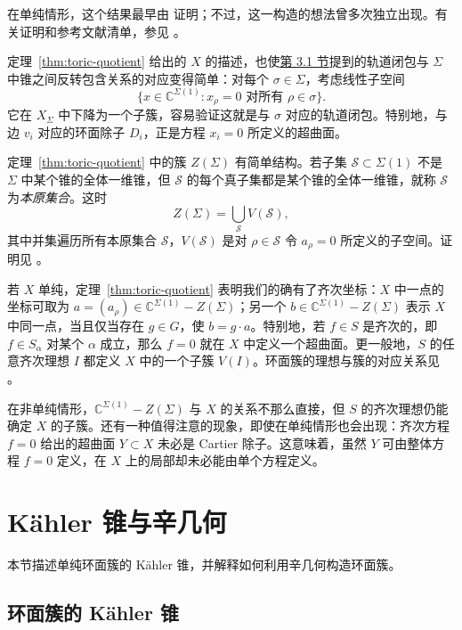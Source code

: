 在单纯情形，这个结果最早由  证明；不过，这一构造的想法曾多次独立出现。有关证明和参考文献清单，参见 。

定理~\ref{thm:toric-quotient} 给出的 $X$ 的描述，也使\hyperref[sec:cones-fans]{第 3.1 节}提到的轨道闭包与 $\Sigma$ 中锥之间反转包含关系的对应变得简单：对每个 $\sigma\in\Sigma$，考虑线性子空间
\[
\{x\in\mathbb C^{\Sigma(1)}:x_\rho=0
\text{ 对所有 }\rho\in\sigma\}.
\]
它在 $X_\Sigma$ 中下降为一个子簇，容易验证这就是与 $\sigma$ 对应的轨道闭包。特别地，与边 $v_i$ 对应的环面除子 $D_i$，正是方程 $x_i=0$ 所定义的超曲面。

定理~\ref{thm:toric-quotient} 中的簇 $Z(\Sigma)$ 有简单结构。若子集 $\mathcal S\subset\Sigma(1)$ 不是 $\Sigma$ 中某个锥的全体一维锥，但 $\mathcal S$ 的每个真子集都是某个锥的全体一维锥，就称 $\mathcal S$ 为\emph{本原集合}。这时
\begin{equation}\label{eq:toric-primitive-z}
Z(\Sigma)=\bigcup_{\mathcal S}V(\mathcal S),
\end{equation}
其中并集遍历所有本原集合 $\mathcal S$，$V(\mathcal S)$ 是对 $\rho\in\mathcal S$ 令 $a_\rho=0$ 所定义的子空间。证明见 。

若 $X$ 单纯，定理~\ref{thm:toric-quotient} 表明我们的确有了齐次坐标：$X$ 中一点的坐标可取为
$a=(a_\rho)\in\mathbb C^{\Sigma(1)}-Z(\Sigma)$；另一个
$b\in\mathbb C^{\Sigma(1)}-Z(\Sigma)$ 表示 $X$ 中同一点，当且仅当存在 $g\in G$，使 $b=g\cdot a$。特别地，若 $f\in S$ 是齐次的，即 $f\in S_\alpha$ 对某个 $\alpha$ 成立，那么 $f=0$ 就在 $X$ 中定义一个超曲面。更一般地，$S$ 的任意齐次理想 $I$ 都定义 $X$ 中的一个子簇 $V(I)$。环面簇的理想与簇的对应关系见 。

在非单纯情形，$\mathbb C^{\Sigma(1)}-Z(\Sigma)$ 与 $X$ 的关系不那么直接，但 $S$ 的齐次理想仍能确定 $X$ 的子簇。还有一种值得注意的现象，即使在单纯情形也会出现：齐次方程 $f=0$ 给出的超曲面 $Y\subset X$ 未必是 Cartier 除子。这意味着，虽然 $Y$ 可由整体方程 $f=0$ 定义，在 $X$ 上的局部却未必能由单个方程定义。

\section{Kähler 锥与辛几何}\label{sec:kahler-symplectic}

本节描述单纯环面簇的 Kähler 锥，并解释如何利用辛几何构造环面簇。

\subsection{环面簇的 Kähler 锥}\label{subsec:toric-kahler-cone}

